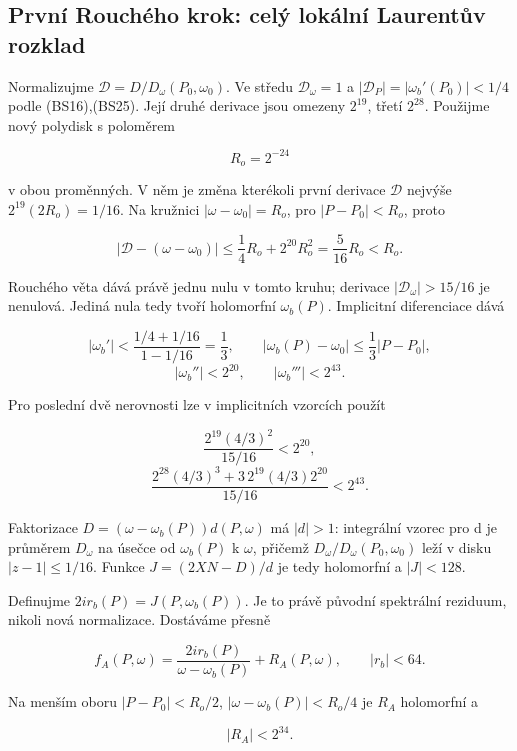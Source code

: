 \documentclass[11pt,a4paper]{article}
\theoremstyle{remark}\newtheorem{remark}[theorem]{Poznámka}
\numberwithin{equation}{section}
\begin{document}
\hypertarget{prvnuxed-rouchuxe9ho-krok-celuxfd-lokuxe1lnuxed-laurentux16fv-rozklad}{%
\subsection{První Rouchého krok: celý lokální Laurentův
rozklad}\label{prvnuxed-rouchuxe9ho-krok-celuxfd-lokuxe1lnuxed-laurentux16fv-rozklad}}

Normalizujme \(\mathcal D=D/D_\omega(P_0,\omega_0)\). Ve středu
\(\mathcal D_\omega=1\) a \(|\mathcal D_P|=|\omega_b'(P_0)|<1/4\) podle
(BS16),(BS25). Její druhé derivace jsou omezeny \(2^{19}\), třetí
\(2^{28}\). Použijme nový polydisk s poloměrem

\[
R_o=2^{-24}
\tag{BF14}
\]

v obou proměnných. V něm je změna kterékoli první derivace
\(\mathcal D\) nejvýše \(2^{19}(2R_o)=1/16\). Na kružnici
\(|\omega-\omega_0|=R_o\), pro \(|P-P_0|<R_o\), proto

\[
|\mathcal D-(\omega-\omega_0)|
\le \frac14R_o+2^{20}R_o^2
=\frac5{16}R_o<R_o.
\tag{BF15}
\]

Rouchého věta dává právě jednu nulu v tomto kruhu; derivace
\(|\mathcal D_\omega|>15/16\) je nenulová. Jediná nula tedy tvoří
holomorfní \(\omega_b(P)\). Implicitní diferenciace dává

\[
|\omega_b'|<\frac{1/4+1/16}{1-1/16}=\frac13,
\qquad |\omega_b(P)-\omega_0|\le\frac13|P-P_0|,
\] \[
|\omega_b''|<2^{20},\qquad |\omega_b'''|<2^{43}.
\tag{BF16}
\]

Pro poslední dvě nerovnosti lze v implicitních vzorcích použít

\[
\frac{2^{19}(4/3)^2}{15/16}<2^{20},
\] \[
\frac{2^{28}(4/3)^3+
3\,2^{19}(4/3)2^{20}}{15/16}<2^{43}.
\]

Faktorizace \(D=(\omega-\omega_b(P))d(P,\omega)\) má \(|d|>1\):
integrální vzorec pro d je průměrem \(D_\omega\) na úsečce od
\(\omega_b(P)\) k \(\omega\), přičemž
\(D_\omega/D_\omega(P_0,\omega_0)\) leží v disku \(|z-1|\le1/16\).
Funkce \(J=(2XN-D)/d\) je tedy holomorfní a \(|J|<128\).

Definujme \(2ir_b(P)=J(P,\omega_b(P))\). Je to právě původní spektrální
reziduum, nikoli nová normalizace. Dostáváme přesně

\[
\boxed{
f_A(P,\omega)=\frac{2ir_b(P)}{\omega-\omega_b(P)}
+R_A(P,\omega),\qquad |r_b|<64.}
\tag{BF17}
\]

Na menším oboru \(|P-P_0|<R_o/2\), \(|\omega-\omega_b(P)|<R_o/4\) je
\(R_A\) holomorfní a

\[
|R_A|<2^{34}.
\tag{BF18}
\]
\end{document}
